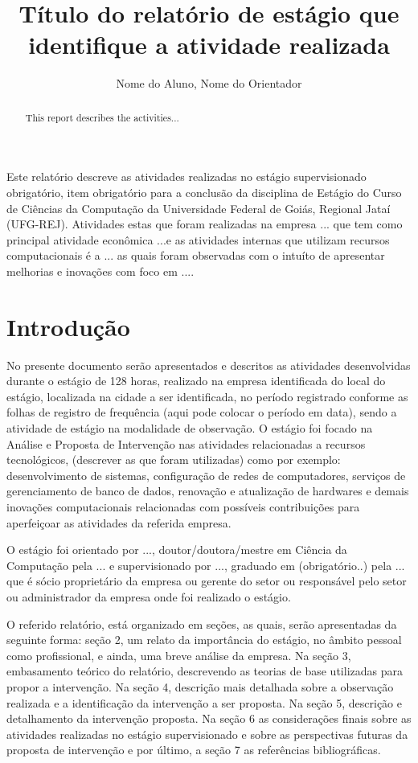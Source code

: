 \documentclass[12pt]{article}
\title{Título do relatório de estágio que identifique a atividade realizada}
\author{Nome do Aluno\inst{1}, Nome do Orientador\inst{1} }
\begin{document}
 

\maketitle

\begin{abstract}
  This report describes the activities...
\end{abstract}

\begin{resumo} 
  Este relatório descreve as atividades realizadas no estágio supervisionado obrigatório, item obrigatório para a conclusão da disciplina de Estágio do Curso de Ciências da Computação da Universidade Federal de Goiás, Regional Jataí (UFG-REJ). Atividades estas que foram realizadas na empresa ... que tem como principal atividade econômica ...e as atividades internas que utilizam recursos computacionais é a ... as quais foram observadas com o intuíto de apresentar melhorias e inovações com foco em .... 
  
\end{resumo}


\section{Introdução}\label{sec:introducao}

No presente documento serão apresentados e descritos as atividades desenvolvidas durante o estágio de 128 horas, realizado na empresa identificada do local do estágio, localizada na cidade a ser identificada, no período registrado conforme as folhas de registro de frequência (aqui pode colocar o período em data), sendo a atividade de estágio na modalidade de observação. O estágio foi focado na Análise e Proposta de Intervenção nas atividades relacionadas a recursos tecnológicos, (descrever as que foram utilizadas) como por exemplo: desenvolvimento de sistemas, configuração de redes de computadores, serviços de gerenciamento de banco de dados, renovação e atualização de hardwares e demais inovações computacionais relacionadas com possíveis contribuições para aperfeiçoar as atividades da referida empresa.
	
    O estágio foi orientado por ..., doutor/doutora/mestre em Ciência da Computação pela ... e supervisionado por ..., graduado em (obrigatório..) pela ... que é sócio proprietário da empresa ou gerente do setor ou responsável pelo setor ou administrador da empresa onde foi realizado o estágio.
    
      O referido relatório, está organizado em seções, as quais, serão apresentadas da seguinte forma: seção 2, um relato da importância do estágio, no âmbito pessoal como profissional, e ainda, uma breve análise da empresa. Na seção 3, embasamento teórico do relatório, descrevendo as teorias de base utilizadas para propor a intervenção.  Na seção 4, descrição mais detalhada sobre a observação realizada e a identificação da intervenção a ser proposta. Na seção 5, descrição e detalhamento da intervenção proposta. Na seção 6 as considerações finais sobre as atividades realizadas no estágio supervisionado e sobre as perspectivas futuras da proposta de intervenção e por último, a seção 7 as referências bibliográficas.
\end{document}

